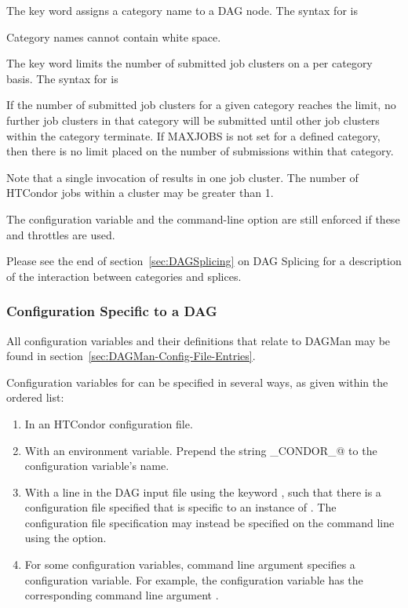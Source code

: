The  key word assigns a category name to a DAG node.
The syntax for  is

  

Category names cannot contain white space.

The  key word limits the number of submitted job clusters
on a per category basis.
The syntax for  is

  

If the number of submitted job clusters for a given category reaches the limit,
no further job clusters in that category will be submitted until other
job clusters within the category terminate.
If MAXJOBS is not set for a defined category,
then there is no limit placed on the number of submissions
within that category.

Note that a single invocation
of  results in one job cluster.
The number of HTCondor jobs within a cluster may be greater than 1. 

The  configuration variable  
and the   command-line option
are still enforced if these  and  throttles are used.

Please see the end of section~\ref{sec:DAGSplicing}
on DAG Splicing for a description of the interaction between
categories and splices.

\subsubsection{\label{sec:DAG-configuration}Configuration Specific to a DAG}

All configuration variables and their definitions that relate to 
DAGMan may be found in section~\ref{sec:DAGMan-Config-File-Entries}.

Configuration variables for  can be specified in several
ways, as given within the ordered list:
\begin{enumerate}
\item
In an HTCondor configuration file.
\item
With an environment variable.
Prepend the string \verb@_CONDOR_@ to the configuration variable's name.
\item
With a line in the DAG input file using the keyword , 
such that there is a configuration file specified
that is specific to an instance of .
The configuration file specification may instead be specified
on the  command line using the  option.
\item
For some configuration variables,
 command line argument specifies a configuration variable. 
For example, the configuration variable 
has the corresponding command line argument .
\end{enumerate}

